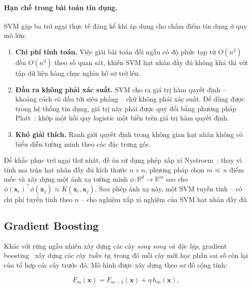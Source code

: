 \paragraph{Hạn chế trong bài toán tín dụng.} SVM gặp ba trở ngại thực tế đáng kể
khi áp dụng cho chấm điểm tín dụng ở quy mô lớn:

\begin{enumerate}[label=(\arabic*)]
  \item \textbf{Chi phí tính toán.} Việc giải bài toán đối ngẫu có độ phức tạp từ
  $O(n^2)$ đến $O(n^3)$ theo số quan sát, khiến SVM hạt nhân đầy đủ không khả thi
  với tập dữ liệu hàng chục nghìn hồ sơ trở lên.

  \item \textbf{Đầu ra không phải xác suất.} SVM cho ra giá trị hàm quyết định --
  khoảng cách có dấu tới siêu phẳng -- chứ không phải xác suất. Để dùng được
  trong hệ thống tín dụng, giá trị này phải được quy đổi bằng phương pháp
  Platt~\cite{platt1999}: khớp một hồi quy logistic một biến trên giá trị hàm
  quyết định.

  \item \textbf{Khó giải thích.} Ranh giới quyết định trong không gian hạt nhân
  không có biểu diễn tường minh theo các đặc trưng gốc.
\end{enumerate}

Để khắc phục trở ngại thứ nhất, đề án sử dụng phép xấp xỉ
Nystroem~\cite{williams2001}: thay vì tính
ma trận hạt nhân đầy đủ kích thước $n \times n$, phương pháp chọn $m \ll n$ điểm
mốc và xây dựng một ánh xạ tường minh $\phi: \mathbb{R}^d \to \mathbb{R}^m$ sao
cho $\phi(\bm{x}_i)^{\!\top}\phi(\bm{x}_j) \approx K(\bm{x}_i, \bm{x}_j)$. Sau
phép ánh xạ này, một SVM tuyến tính -- có chi phí tuyến tính theo $n$ -- cho
nghiệm xấp xỉ nghiệm của SVM hạt nhân đầy đủ.

\subsection{Gradient Boosting}
\label{subsec:gradient-boosting}

Khác với rừng ngẫu nhiên xây dựng các cây \textit{song song và độc lập}, gradient
boosting~\cite{friedman2001} xây dựng các cây \textit{tuần tự}, trong đó mỗi cây
mới học phần sai số còn lại của tổ hợp các cây trước đó. Mô hình được xây dựng
theo sơ đồ cộng tính:

\begin{equation}
F_m(\bm{x}) = F_{m-1}(\bm{x}) + \eta \, h_m(\bm{x}),
\label{eq:boosting}
\end{equation}


